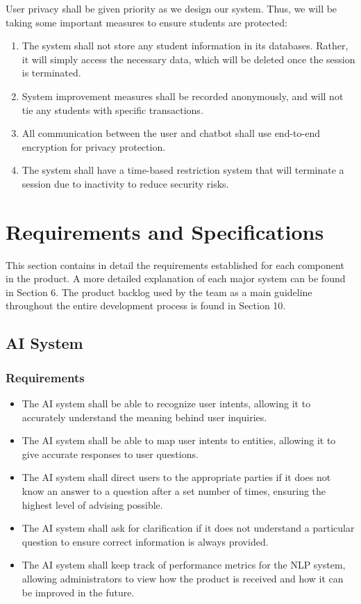 \documentclass[titlepage, 12pt]{article}
\begin{document}
User privacy shall be given priority as we design our system. Thus, we will be taking some important measures to ensure students are protected:

\begin{enumerate}
    \item The system shall not store any student information in its databases. Rather, it will simply access the necessary data, which will be deleted once the session is terminated.
    \item System improvement measures shall be recorded anonymously, and will not tie any students with specific transactions.
    \item All communication between the user and chatbot shall use end-to-end encryption for privacy protection.
    \item The system shall have a time-based restriction system that will terminate a session due to inactivity to reduce security risks.
\end{enumerate}

\pagebreak

\section{Requirements and Specifications}

This section contains in detail the requirements established for each component in the product. A more detailed explanation of each major system can be found in Section 6. The product backlog used by the team as a main guideline throughout the entire development process is found in Section 10.

\subsection{AI System}

\subsubsection{Requirements}

\begin{itemize}
    \item The AI system shall be able to recognize user intents, allowing it to accurately understand the meaning behind user inquiries.
    \item The AI system shall be able to map user intents to entities, allowing it to give accurate responses to user questions.
    \item The AI system shall direct users to the appropriate parties if it does not know an answer to a question after a set number of times, ensuring the highest level of advising possible.
    \item The AI system shall ask for clarification if it does not understand a particular question to ensure correct information is always provided.
    \item The AI system shall keep track of performance metrics for the NLP system, allowing administrators to view how the product is received and how it can be improved in the future.
\end{itemize}
\end{document}
